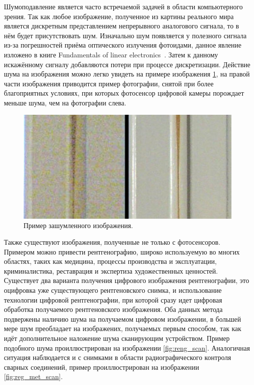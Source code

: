 





\Intro

Шумоподавление является часто встречаемой задачей в области компьютерного зрения. Так как любое изображение, полученное из картины реального мира является дискретным представлением непрерывного аналогового сигнала, то в нём будет присутствовать шум. Изначально шум появляется у полезного сигнала из-за погрешностей приёма оптического излучения фотоидами, данное явление изложено в книге Fundamentals of linear electronics~\autocite{HardwareImageNoise}. Затем к данному искажённому сигналу добавляются потери при процессе дискретизации. Действие шума на изображения можно легко увидеть на примере изображения \ref{fig:noise_compration}, на правой части изображения приводится пример фотографии, снятой при более благоприятных условиях, при которых фотосенсор цифровой камеры порождает меньше шума, чем на фотографии слева. 

\begin{figure}[h]
	\centering
	\includegraphics[width=\textwidth]{img/Noise_Comparison}
	\caption{Пример зашумленного изображения.}
	\label{fig:noise_compration}
\end{figure}

Также существуют изображения, полученные не только с фотосенсоров. Примером можно привести рентгенографию, широко используемую во многих областях, таких как медицина, процессы производства и эксплуатации, криминалистика, реставрация и экспертиза художественных ценностей. Существует два варианта получения цифрового изображения рентгенографии, это оцифровка уже существующего рентгеновского снимка, и использование технологии цифровой рентгенографии, при которой сразу идет цифровая обработка получаемого рентгеновского изображения. Оба данных метода подвержены наличию шума на получаемом цифровом изображении, в большей мере шум преобладает на изображених, получаемых первым способом, так как идёт дополнительное наложение шума сканирующим устройством. Пример подобного шума проиллюстрирован на изображении \ref{fig:reng_scan}. Аналогичная ситуация наблюдается и с снимками в области радиографического контроля сварных соединений, пример проиллюстрирован на изображении \ref{fig:reg_met_scan}.

